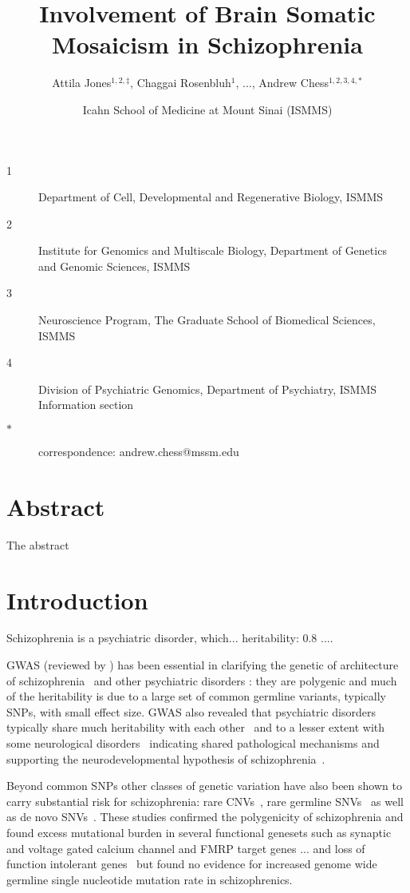 \documentclass[letterpaper]{article}
\title{Involvement of Brain Somatic Mosaicism in Schizophrenia}
\author{Attila Jones\(^{1,2,\ddagger}\), Chaggai Rosenbluh\(^{1}\), ..., Andrew Chess\(^{1,2,3,4,\ast}\)}
\date{Icahn School of Medicine at Mount Sinai (ISMMS)}
\begin{document}
\maketitle

\begin{description}
\item[1] Department of Cell, Developmental and Regenerative Biology, ISMMS 
\item[2] Institute for Genomics and Multiscale Biology, Department of Genetics and Genomic Sciences, ISMMS 
\item[3] Neuroscience Program, The Graduate School of Biomedical Sciences, ISMMS 
\item[4] Division of Psychiatric Genomics, Department of Psychiatry, ISMMS 
Information section
\item[\(\ast\)] correspondence: andrew.chess@mssm.edu 
\end{description}

\clearpage

\section*{Abstract}

The abstract

\section*{Introduction}

Schizophrenia is a psychiatric disorder, which... heritability: 0.8 ...\cite{Kahn2015}.

GWAS (reviewed by \cite{Visscher2017}) has been essential in clarifying the
genetic of architecture of schizophrenia~\cite{Ripke2014,Pardinas2018} and other psychiatric disorders
\cite{Sullivan2012}: they are polygenic and much of the heritability is due to
a large set of common germline variants, typically SNPs, with
small effect size.  GWAS also revealed that psychiatric disorders
typically share much heritability with each
other~\cite{Consortium2009,PsychiatricGenomicsConsortium2013} and to a lesser extent with
some neurological disorders~\cite{Consortium2018} indicating shared
pathological mechanisms and supporting the neurodevelopmental hypothesis of
schizophrenia~\cite{Nour2015}.

Beyond common SNPs other classes of genetic variation have also been shown to
carry substantial risk for schizophrenia: rare CNVs~\cite{Rees2014}, rare germline
SNVs~\cite{Purcell2014,Singh2017} as well as de novo
SNVs~\cite{Fromer2014,Rees2020}.  These studies confirmed the polygenicity of
schizophrenia and found excess mutational burden in several functional
genesets such as synaptic and voltage gated calcium channel and FMRP target
genes\cite{Fromer2014,Purcell2014} ... and loss of function intolerant
genes~\cite{Rees2020,Singh2017} but found no evidence for increased genome
wide germline single nucleotide mutation rate in schizophrenics.
\end{document}
